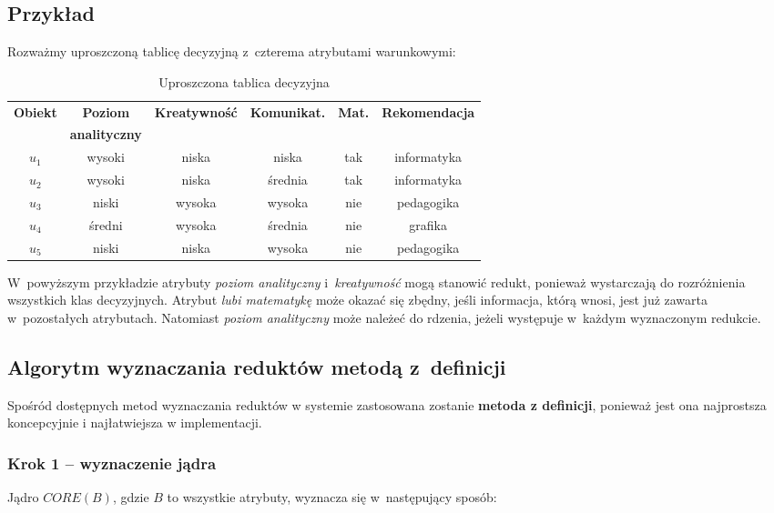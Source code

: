 \documentclass[12pt,a4paper,oneside]{article}
\begin{document}
\subsection{Przykład}

Rozważmy uproszczoną tablicę decyzyjną z~czterema atrybutami warunkowymi:

\begin{table}[h]
\centering
\begin{tabular}{|c|c|c|c|c|c|}
\hline
\textbf{Obiekt} & \textbf{Poziom} & \textbf{Kreatywność} & \textbf{Komunikat.} & \textbf{Mat.} & \textbf{Rekomendacja} \\
 & \textbf{analityczny} & & & & \\
\hline
$u_1$ & wysoki & niska & niska & tak & informatyka \\
$u_2$ & wysoki & niska & średnia & tak & informatyka \\
$u_3$ & niski & wysoka & wysoka & nie & pedagogika \\
$u_4$ & średni & wysoka & średnia & nie & grafika \\
$u_5$ & niski & niska & wysoka & nie & pedagogika \\
\hline
\end{tabular}
\caption{Uproszczona tablica decyzyjna}
\end{table}

W~powyższym przykładzie atrybuty \emph{poziom analityczny} i~\emph{kreatywność} mogą stanowić redukt, ponieważ wystarczają do rozróżnienia wszystkich klas decyzyjnych. Atrybut \emph{lubi matematykę} może okazać się zbędny, jeśli informacja, którą wnosi, jest już zawarta w~pozostałych atrybutach. Natomiast \emph{poziom analityczny} może należeć do rdzenia, jeżeli występuje w~każdym wyznaczonym redukcie.


\subsection{Algorytm wyznaczania reduktów metodą z~definicji}

Spośród dostępnych metod wyznaczania reduktów w systemie zastosowana zostanie \textbf{metoda z definicji}, ponieważ jest ona najprostsza koncepcyjnie i najłatwiejsza w implementacji.

\subsubsection{Krok 1 -- wyznaczenie jądra}

Jądro $CORE(B)$, gdzie $B$ to wszystkie atrybuty, wyznacza się w~następujący sposób:
\end{document}
